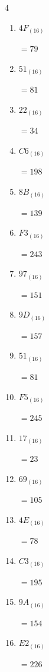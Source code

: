 \begin{multicols}{4}
\begin{enumerate}
        $=168$

  \item $4F_{(16)}$

        $=79$

  \item $51_{(16)}$

        $=81$

\columnbreak %

  \item $22_{(16)}$

        $=34$

  \item $C6_{(16)}$

        $=198$

  \item $8B_{(16)}$

        $=139$

  \item $F3_{(16)}$

        $=243$

  \item $97_{(16)}$

        $=151$

  \item $9D_{(16)}$

        $=157$

  \item $51_{(16)}$

        $=81$

  \item $F5_{(16)}$

        $=245$

  \item $17_{(16)}$

        $=23$

  \item $69_{(16)}$

        $=105$

  \item $4E_{(16)}$

        $=78$

  \item $C3_{(16)}$

        $=195$

  \item $9A_{(16)}$

        $=154$

  \item $E2_{(16)}$

        $=226$


\end{enumerate}
\end{multicols}
